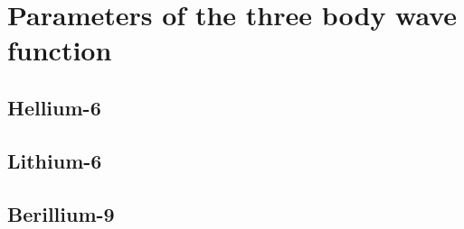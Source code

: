 
\chapter{Parameters of the three body wave function} %

\label{AppendixA} %

\section{Hellium-6}

\section{Lithium-6}

\section{Berillium-9}


